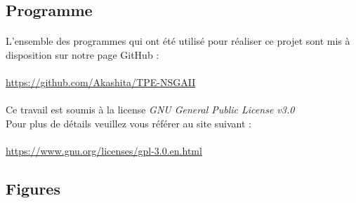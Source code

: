 \documentclass[12pt]{report}
\begin{document}
    \subsection{Programme}
      \paragraph{}
      L'ensemble des programmes qui ont été utilisé pour réaliser ce projet sont mis à disposition sur notre page GitHub : \\\\
      \url{https://github.com/Akashita/TPE-NSGAII}

      \paragraph{}
      Ce travail est soumis à la license \emph{GNU General Public License v3.0}\\ %
      Pour plus de détails veuillez vous référer au site suivant : \\\\
      \url{https://www.gnu.org/licenses/gpl-3.0.en.html}

    \subsection{Figures}
\end{document}
